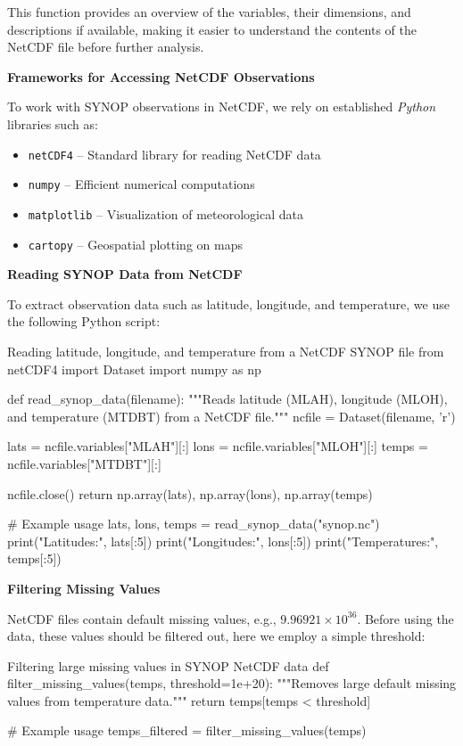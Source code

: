 This function provides an overview of the variables, their dimensions, and descriptions if available, making it easier to understand the contents of the NetCDF file before further analysis.

\textbf{Frameworks for Accessing NetCDF Observations}

To work with SYNOP observations in NetCDF, we rely on established \emph{Python} libraries such as:
\begin{itemize}
    \item \texttt{netCDF4} -- Standard library for reading NetCDF data
    \item \texttt{numpy} -- Efficient numerical computations
    \item \texttt{matplotlib} -- Visualization of meteorological data
    \item \texttt{cartopy} -- Geospatial plotting on maps
\end{itemize}

\textbf{Reading SYNOP Data from NetCDF}

To extract observation data such as latitude, longitude, and temperature, we use the following Python script:

\begin{codeonly}{Reading latitude, longitude, and temperature from a NetCDF SYNOP file}
from netCDF4 import Dataset
import numpy as np

def read_synop_data(filename):
    """Reads latitude (MLAH), longitude (MLOH), and temperature (MTDBT) from a NetCDF file."""
    ncfile = Dataset(filename, 'r')
    
    lats = ncfile.variables["MLAH"][:]
    lons = ncfile.variables["MLOH"][:]
    temps = ncfile.variables["MTDBT"][:]
    
    ncfile.close()
    return np.array(lats), np.array(lons), np.array(temps)

# Example usage
lats, lons, temps = read_synop_data("synop.nc")
print("Latitudes:", lats[:5])
print("Longitudes:", lons[:5])
print("Temperatures:", temps[:5])
\end{codeonly}

\textbf{Filtering Missing Values}

NetCDF files contain default missing values, e.g., $9.96921\times10^{36}$. Before using the data, these values should be filtered out, here we employ a simple threshold:

\begin{codeonly}{Filtering large missing values in SYNOP NetCDF data}
def filter_missing_values(temps, threshold=1e+20):
    """Removes large default missing values from temperature data."""
    return temps[temps < threshold]

# Example usage
temps_filtered = filter_missing_values(temps)
\end{codeonly}

